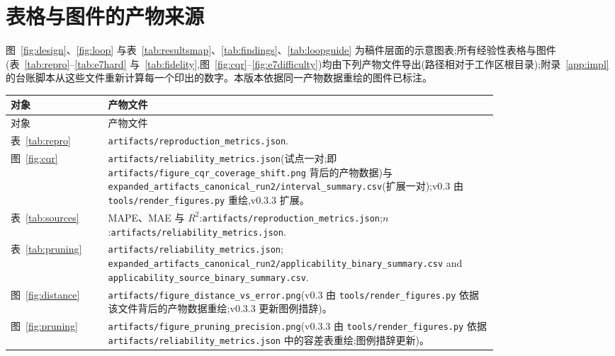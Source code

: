 \documentclass[11pt,a4paper]{ctexart}
\begin{document}
\section{表格与图件的产物来源}
\label{app:sources}
图~\ref{fig:design}、\ref{fig:loop} 与表~\ref{tab:resultsmap}、\ref{tab:findings}、\ref{tab:loopguide} 为稿件层面的示意图表;所有经验性表格与图件(表~\ref{tab:repro}--\ref{tab:e7hard} 与~\ref{tab:fidelity},图~\ref{fig:cqr}--\ref{fig:e7difficulty})均由下列产物文件导出(路径相对于工作区根目录);附录~\ref{app:impl} 的台账脚本从这些文件重新计算每一个印出的数字。本版本依据同一产物数据重绘的图件已标注。
{\scriptsize
\begin{longtable}{lp{0.80\linewidth}}
\toprule
对象 & 产物文件 \\
\midrule
\endfirsthead
\toprule
对象 & 产物文件 \\
\midrule
\endhead
表~\ref{tab:repro} & \texttt{artifacts/\allowbreak reproduction\_\allowbreak metrics.json}. \\
图~\ref{fig:cqr} & \texttt{artifacts/\allowbreak reliability\_\allowbreak metrics.json}(试点一对;即 \texttt{artifacts/\allowbreak figure\_\allowbreak cqr\_\allowbreak coverage\_\allowbreak shift.png} 背后的产物数据)与 \texttt{expanded\_\allowbreak artifacts\_\allowbreak canonical\_\allowbreak run2/\allowbreak interval\_\allowbreak summary.csv}(扩展一对);v0.3 由 \texttt{tools/\allowbreak render\_\allowbreak figures.py} 重绘,v0.3.3 扩展。 \\
表~\ref{tab:sources} & MAPE、MAE 与 $R^2$:\texttt{artifacts/\allowbreak reproduction\_\allowbreak metrics.json};$n$:\texttt{artifacts/\allowbreak reliability\_\allowbreak metrics.json}. \\
表~\ref{tab:pruning} & \texttt{artifacts/\allowbreak reliability\_\allowbreak metrics.json}; \texttt{expanded\_\allowbreak artifacts\_\allowbreak canonical\_\allowbreak run2/\allowbreak applicability\_\allowbreak binary\_\allowbreak summary.csv} and \texttt{applicability\_\allowbreak source\_\allowbreak binary\_\allowbreak summary.csv}. \\
图~\ref{fig:distance} & \texttt{artifacts/\allowbreak figure\_\allowbreak distance\_\allowbreak vs\_\allowbreak error.png}(v0.3 由 \texttt{tools/\allowbreak render\_\allowbreak figures.py} 依据该文件背后的产物数据重绘;v0.3.3 更新图例措辞)。 \\
图~\ref{fig:pruning} & \texttt{artifacts/\allowbreak figure\_\allowbreak pruning\_\allowbreak precision.png}(v0.3.3 由 \texttt{tools/\allowbreak render\_\allowbreak figures.py} 依据 \texttt{artifacts/\allowbreak reliability\_\allowbreak metrics.json} 中的容差表重绘;图例措辞更新)。 \\

\end{longtable}}
\end{document}
